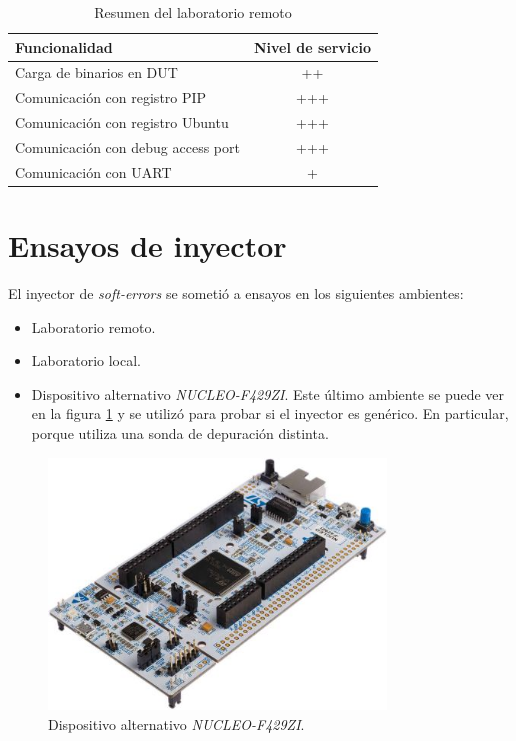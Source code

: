 \begin{table}[h]
	\centering
	\caption[Resumen del laboratorio remoto]{Resumen del laboratorio remoto}

	\begin{tabular}{l c}    
		\toprule
        \textbf{Funcionalidad}             & \textbf{Nivel de servicio} \\
		\midrule
		Carga de binarios en DUT           & ++  \\		
		Comunicación con registro PIP      & +++ \\
		Comunicación con registro Ubuntu   & +++ \\
		Comunicación con debug access port & +++ \\
		Comunicación con UART              & +   \\
		\bottomrule
		\hline
	\end{tabular}
	\label{tab:funcionalidades}
\end{table}

\section{Ensayos de inyector}
\label{sec:testinyector}

El inyector de \emph{soft-errors} se sometió a ensayos en los siguientes ambientes:

\begin{itemize}
    \item Laboratorio remoto.
    \item Laboratorio local.
    \item Dispositivo alternativo \emph{NUCLEO-F429ZI}.
        Este último ambiente se puede ver en la figura \ref{fig:alternativo} y se utilizó para probar si el inyector es genérico.
        En particular, porque utiliza una sonda de depuración distinta.
\end{itemize}

\begin{figure}[htbp]
	\centering
	\includegraphics[width=0.8\textwidth]{./Figures/alternativo.jpg}
    \caption{Dispositivo alternativo \emph{NUCLEO-F429ZI}.}
	\label{fig:alternativo}
\end{figure}


